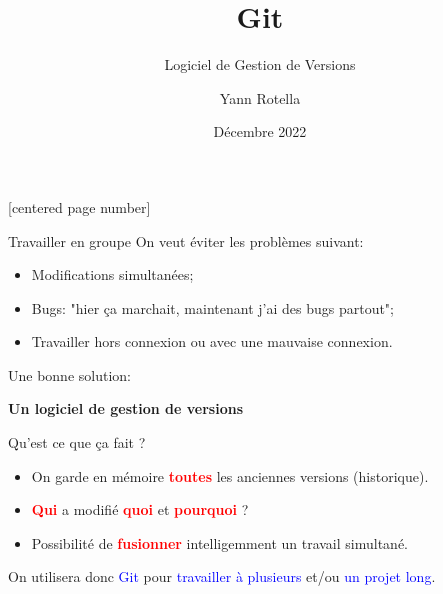 \documentclass[presentation]{beamer}
\title{Git}
\subtitle{Logiciel de Gestion de Versions}
\author{Yann Rotella}
\institute{IN100, Université de Versailles Saint Quentin en Yvelines}
\date{Décembre 2022}
\begin{document}
\lstset{language=bash}
\begin{frame}[noframenumbering]
\titlepage
\end{frame}
[centered page number]

\begin{frame}{Travailler en groupe}
On veut éviter les problèmes suivant:
\begin{itemize}
	\item Modifications simultanées;
	\item Bugs: "hier \c ca marchait, maintenant j'ai des bugs partout";
	\item Travailler hors connexion ou avec une mauvaise connexion.
\end{itemize}
\pause
Une bonne solution:
\begin{center}
	\textbf{Un logiciel de gestion de versions}
\end{center}
\end{frame}

\begin{frame}{Qu'est ce que \c ca fait ?}
\begin{itemize}
	\item On garde en mémoire \textcolor{red}{\textbf{toutes}} les anciennes versions (historique).
	\item \textcolor{red}{\textbf{Qui}} a modifié \textcolor{red}{\textbf{quoi}} et \textcolor{red}{\textbf{pourquoi}} ?
	\item Possibilité de \textcolor{red}{\textbf{fusionner}} intelligemment un travail simultané.
\end{itemize}
\pause
\hspace{1cm}
\begin{center}
	On utilisera donc \textcolor{blue}{Git} pour \textcolor{blue}{travailler à plusieurs} et/ou \textcolor{blue}{un projet long}.
\end{center}
\end{frame}
\end{document}
